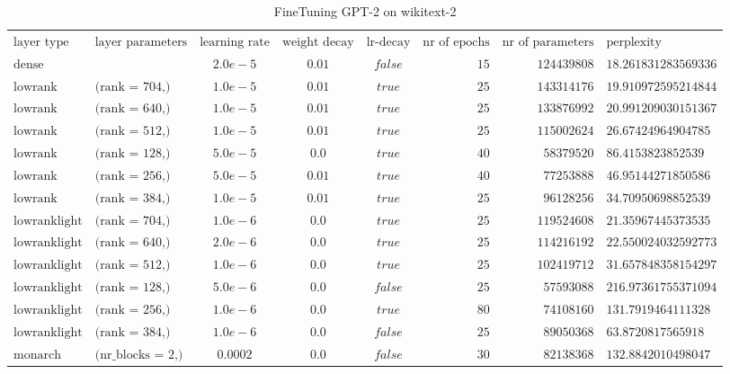 \begin{table}[h!]
\centering
\tiny
\caption{FineTuning GPT-2 on wikitext-2}
\label{tab:ft_results}
\begin{tabular}{llcccrrl}
$\text{layer type}$ & $\text{layer parameters}$ & $\text{learning rate}$ & $\text{weight decay}$ & $\text{lr-decay}$ & $\text{nr of epochs}$ & $\text{nr of parameters}$ & $\text{perplexity}$\\
$\text{dense}$ & $\text{}$ & $2.0e-5$ & $0.01$ & $false$ & $15$ & $124439808$ & $18.261831283569336$\\
$\text{lowrank}$ & $\text{(rank = 704,)}$ & $1.0e-5$ & $0.01$ & $true$ & $25$ & $143314176$ & $19.910972595214844$\\
$\text{lowrank}$ & $\text{(rank = 640,)}$ & $1.0e-5$ & $0.01$ & $true$ & $25$ & $133876992$ & $20.991209030151367$\\
$\text{lowrank}$ & $\text{(rank = 512,)}$ & $1.0e-5$ & $0.01$ & $true$ & $25$ & $115002624$ & $26.67424964904785$\\
$\text{lowrank}$ & $\text{(rank = 128,)}$ & $5.0e-5$ & $0.0$ & $true$ & $40$ & $58379520$ & $86.4153823852539$\\
$\text{lowrank}$ & $\text{(rank = 256,)}$ & $5.0e-5$ & $0.01$ & $true$ & $40$ & $77253888$ & $46.95144271850586$\\
$\text{lowrank}$ & $\text{(rank = 384,)}$ & $1.0e-5$ & $0.01$ & $true$ & $25$ & $96128256$ & $34.70950698852539$\\
$\text{lowranklight}$ & $\text{(rank = 704,)}$ & $1.0e-6$ & $0.0$ & $true$ & $25$ & $119524608$ & $21.35967445373535$\\
$\text{lowranklight}$ & $\text{(rank = 640,)}$ & $2.0e-6$ & $0.0$ & $true$ & $25$ & $114216192$ & $22.550024032592773$\\
$\text{lowranklight}$ & $\text{(rank = 512,)}$ & $1.0e-6$ & $0.0$ & $true$ & $25$ & $102419712$ & $31.657848358154297$\\
$\text{lowranklight}$ & $\text{(rank = 128,)}$ & $5.0e-6$ & $0.0$ & $false$ & $25$ & $57593088$ & $216.97361755371094$\\
$\text{lowranklight}$ & $\text{(rank = 256,)}$ & $1.0e-6$ & $0.0$ & $true$ & $80$ & $74108160$ & $131.7919464111328$\\
$\text{lowranklight}$ & $\text{(rank = 384,)}$ & $1.0e-6$ & $0.0$ & $false$ & $25$ & $89050368$ & $63.8720817565918$\\
$\text{monarch}$ & $\text{(nr\_blocks = 2,)}$ & $0.0002$ & $0.0$ & $false$ & $30$ & $82138368$ & $132.8842010498047$\\

\end{tabular}
\end{table}
